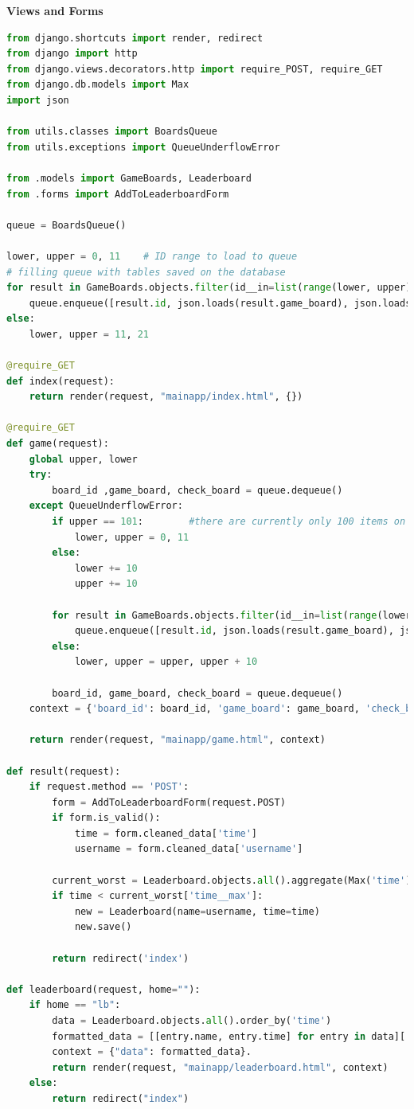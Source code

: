 \documentclass[12pt, a4paper]{report}
\begin{document}
    \textbf{Views and Forms}
    \begin{lstlisting}[language=Python, caption=mainapp/views.py]
from django.shortcuts import render, redirect
from django import http
from django.views.decorators.http import require_POST, require_GET
from django.db.models import Max
import json

from utils.classes import BoardsQueue
from utils.exceptions import QueueUnderflowError

from .models import GameBoards, Leaderboard
from .forms import AddToLeaderboardForm

queue = BoardsQueue()

lower, upper = 0, 11    # ID range to load to queue
# filling queue with tables saved on the database
for result in GameBoards.objects.filter(id__in=list(range(lower, upper))):
    queue.enqueue([result.id, json.loads(result.game_board), json.loads(result.check_board)])
else:
    lower, upper = 11, 21

@require_GET
def index(request):
    return render(request, "mainapp/index.html", {})

@require_GET
def game(request):
    global upper, lower
    try:
        board_id ,game_board, check_board = queue.dequeue()
    except QueueUnderflowError:
        if upper == 101:        #there are currently only 100 items on the database, so it loops back to the starting.
            lower, upper = 0, 11
        else:
            lower += 10
            upper += 10

        for result in GameBoards.objects.filter(id__in=list(range(lower, upper))):  #loading new tables from database
            queue.enqueue([result.id, json.loads(result.game_board), json.loads(result.check_board)])
        else:
            lower, upper = upper, upper + 10

        board_id, game_board, check_board = queue.dequeue()
    context = {'board_id': board_id, 'game_board': game_board, 'check_board': check_board, 'form': AddToLeaderboardForm()}
    
    return render(request, "mainapp/game.html", context)

def result(request):
    if request.method == 'POST':
        form = AddToLeaderboardForm(request.POST)
        if form.is_valid():
            time = form.cleaned_data['time']
            username = form.cleaned_data['username']

        current_worst = Leaderboard.objects.all().aggregate(Max('time'))
        if time < current_worst['time__max']:
            new = Leaderboard(name=username, time=time)
            new.save()

        return redirect('index') 

def leaderboard(request, home=""):
    if home == "lb":
        data = Leaderboard.objects.all().order_by('time')
        formatted_data = [[entry.name, entry.time] for entry in data][:10]
        context = {"data": formatted_data}.
        return render(request, "mainapp/leaderboard.html", context)
    else:
        return redirect("index")
    \end{lstlisting}
\end{document}

